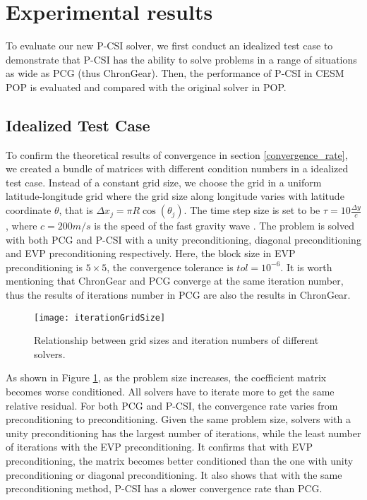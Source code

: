 \section{Experimental results} \label{se:exp}
To evaluate our new P-CSI solver, we first conduct an idealized test case to demonstrate that P-CSI has the ability to solve problems in a range of situations as wide as PCG (thus ChronGear). Then, the performance of P-CSI in CESM POP is evaluated and compared with the original solver in POP.

\subsection{Idealized Test Case}
To confirm the theoretical results of convergence in section \ref{convergence_rate}, we created a bundle of matrices with different condition numbers in a idealized test case.
Instead of a constant grid size, we choose the grid in a uniform latitude-longitude grid where the grid size along longitude varies with latitude coordinate $\theta$, that is $\Delta x_j  = \pi R \cos (\theta_j)$.
The time step size is set to be $\tau = 10\frac{\Delta y}{c}$, where $c = 200m/s$ is the speed of the fast gravity wave \citep{smith2010parallel}.
The problem is solved with both PCG and P-CSI with a unity preconditioning, diagonal preconditioning and EVP preconditioning respectively. Here, the block size in EVP preconditioning is $5\times5$,
the convergence tolerance is $tol = 10^{-6}$.
It is worth mentioning that ChronGear and PCG converge at the same iteration number, thus the results of iterations number in PCG are also the results in ChronGear.

\begin {figure}[!htbp]
\centering
\texttt{[image: iterationGridSize]}
\caption[] {Relationship between grid sizes and iteration numbers of different solvers.\label{fig:iterationGridSize}}
\end{figure}
As shown in Figure \ref{fig:iterationGridSize}, as the problem size increases, the coefficient matrix becomes worse conditioned. All solvers have to iterate more to get the same relative residual.
For both PCG and P-CSI, the convergence rate varies from preconditioning to preconditioning.
Given the same problem size, solvers with a unity preconditioning has the largest number of iterations, while the least number of iterations with the EVP preconditioning.
It confirms that with EVP preconditioning, the matrix becomes better conditioned than the one with unity preconditioning or diagonal preconditioning.
It also shows that with the same preconditioning method, P-CSI has a slower convergence rate than PCG.



